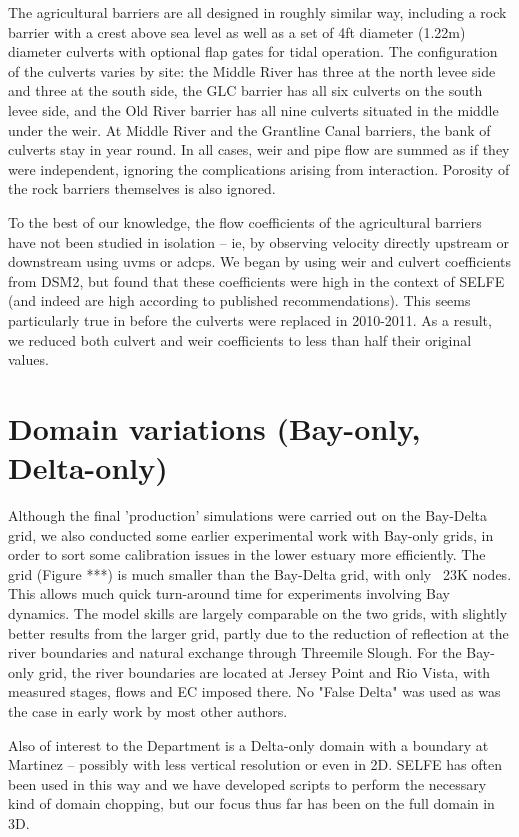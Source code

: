 The agricultural barriers are all designed in roughly similar way, including a rock barrier 
with a crest above sea level as well as a set of 4ft diameter (1.22m) diameter 
culverts with optional flap gates for tidal operation.  The configuration of the culverts varies by
site: the Middle River has three at the north levee side and three at the south side, the GLC barrier 
has all six culverts on the south levee side, and the Old River barrier has all nine culverts situated in the middle
under the weir. At Middle River and the Grantline Canal barriers, the bank of culverts stay in year round.
In all cases, weir and pipe flow are summed as if they were independent, ignoring the complications 
arising from interaction. Porosity of the rock barriers themselves is also ignored.

To the best of our knowledge, the flow coefficients of the agricultural barriers 
have not been studied in isolation -- ie, by observing velocity directly upstream 
or downstream using \glspl{uvm} or \glspl{adcp}.
We began by using weir and culvert coefficients from DSM2, but found that these coefficients
were high in the context of SELFE (and indeed are high according to published recommendations). This
 seems particularly true in before the culverts were replaced in 2010-2011. As a result, we reduced both culvert and
weir coefficients to less than half their original values.

\section{Domain variations (Bay-only, Delta-only)}
Although the final 'production' simulations were carried out on the Bay-Delta grid, 
we also conducted some earlier experimental work with Bay-only grids, in order to sort some 
calibration issues in the lower estuary more efficiently. The grid (Figure ***) 
is much smaller than the Bay-Delta grid, with only ~23K nodes. This allows much 
quick turn-around time for experiments involving Bay dynamics. The model skills are 
largely comparable on the two grids, with slightly better results from the larger grid, 
partly due to the reduction of reflection at the river boundaries
and natural exchange through Threemile Slough. For the Bay-only
grid, the river boundaries are located at Jersey Point and Rio Vista, with measured stages, flows and EC imposed there. 
No "False Delta" was used as was the case in early work by most other authors.

Also of interest to the Department is a Delta-only domain with a boundary at Martinez -- possibly
with less vertical resolution or even in 2D. SELFE has often been used in this way and
we have developed scripts to perform the necessary kind of domain chopping, 
but our focus thus far has been on the full domain in 3D.

